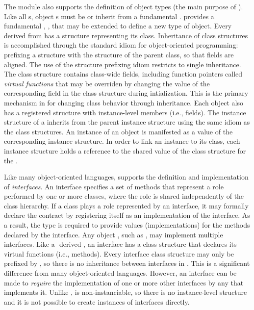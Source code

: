 \documentclass[article,shortnames]{jss}
\begin{document}
The  module also supports the definition of object types
(the main purpose of ). Like all s, object
s must be or inherit from a fundamental .
 provides a fundamental , ,
that may be extended to define a new type of object. Every
 derived from  has a  structure
representing its class. Inheritance of class structures is
accomplished through the standard  idiom for
object-oriented programming: prefixing a structure with the structure
of the parent class, so that fields are aligned. The use of the
structure prefixing idiom restricts  to single
inheritance. The class structure contains class-wide fields, including
function pointers called \emph{virtual functions} that may be
overriden by changing the value of the corresponding field in the
class structure during intialization. This is the primary mechanism in
 for changing class
behavior through inheritance. Each object  also has a
registered structure with instance-level members (i.e., fields). The
instance structure of a  inherits from the parent instance
structure using the same idiom as the class structures. An instance of
an object  is manifested as a value of the corresponding
instance structure. In order to link an instance to its class, each
instance structure holds a reference to the shared value of the class
structure for the .

Like many object-oriented languages,  supports the
definition and implementation of \emph{interfaces}. An interface
specifies a set of methods that represent a role performed by one or
more classes, where the role is shared independently of the class
hierarchy. If a class plays a role represented by an interface, it may
formally declare the contract by registering itself as an
implementation of the interface. As a result, the type is required to
provide values (implementations) for the methods declared by the
interface. Any object , such as ,
may implement multiple interfaces. Like a -derived
, an interface has a class structure that declares its
virtual functions (i.e., methods). Every interface class structure may
only be prefixed by , so there is no inheritance
between interfaces in . This is a significant difference
from many object-oriented languages. However, an interface can be made
to \emph{require} the implementation of one or more other interfaces
by any  that implements it. Unlike ,
 is non-instanciable, so there is no
instance-level structure and it is not possible to create instances of
interfaces directly.
\end{document}
